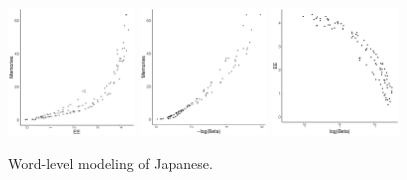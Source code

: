 \documentclass[11pt,letterpaper]{article}
\begin{document}
\begin{figure}
\includegraphics[width=0.3\textwidth]{code/figures/LDC95T8-words-ee-mem.pdf}
\includegraphics[width=0.3\textwidth]{code/figures/LDC95T8-words-logbeta-mem.pdf}
\includegraphics[width=0.3\textwidth]{code/figures/LDC95T8-words-logbeta-ee.pdf}
	\caption{Word-level modeling of Japanese.}\label{fig:jap-logbeta}
\end{figure}
\end{document}
